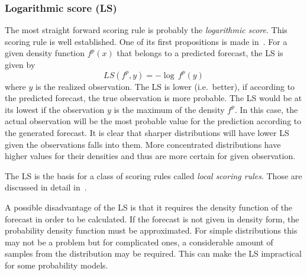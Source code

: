 \documentclass[12pt,a4paper,twoside]{scrartcl}
\numberwithin{equation}{section}
\begin{document}
\subsubsection{Logarithmic score (LS)}\label{sec:ls}
The most straight forward scoring rule is probably the \emph{logarithmic score}. This scoring rule is well established. One of its first propositions is made in~\cite{good1952}. For a given density function \(f^p(x)\) that belongs to a predicted forecast, the LS is given by
\begin{equation}
  LS(f^p,y) = -\log \, f^p(y)
\end{equation}
where \(y\) is the realized observation. The LS is lower (i.e.\ better), if according to the predicted forecast, the true observation is more probable. The LS would be at its lowest if the observation \(y\) is the maximum of the density \(f^p\). In this case, the actual observation will be the most probable value for the prediction according to the generated forecast. It is clear that sharper distributions will have lower LS given the observations falls into them. More concentrated distributions have higher values for their densities and thus are more certain for given observation.

The LS is the basis for a class of scoring rules called \emph{local scoring rules}. Those are discussed in detail in~\cite{ehm2012}.

A possible disadvantage of the LS is that it requires the density function of the forecast in order to be calculated. If the forecast is not given in density form, the probability density function must be approximated. For simple distributions this may not be a problem but for complicated ones, a considerable amount of samples from the distribution may be required. This can make the LS impractical for some probability models.
\end{document}
